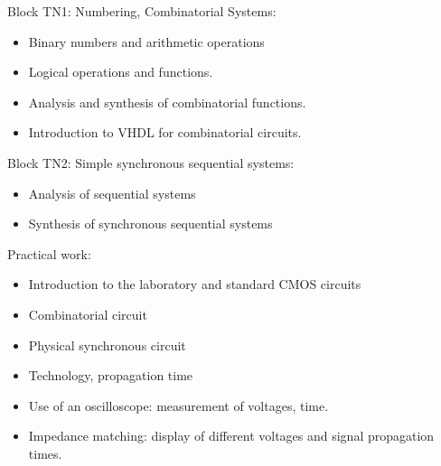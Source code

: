 Block TN1: Numbering, Combinatorial Systems:
\begin{itemize}
    \item Binary numbers and arithmetic operations
    \item Logical operations and functions.
    \item Analysis and synthesis of combinatorial functions.
    \item Introduction to VHDL for combinatorial circuits.
\end{itemize}
Block TN2: Simple synchronous sequential systems:
\begin{itemize}
    \item Analysis of sequential systems
    \item Synthesis of synchronous sequential systems
\end{itemize}
Practical work:
\begin{itemize}
    \item Introduction to the laboratory and standard CMOS circuits
    \item Combinatorial circuit
    \item Physical synchronous circuit
    \item Technology, propagation time
    \item Use of an oscilloscope: measurement of voltages, time.
    \item Impedance matching: display of different voltages and signal propagation times.
\end{itemize}